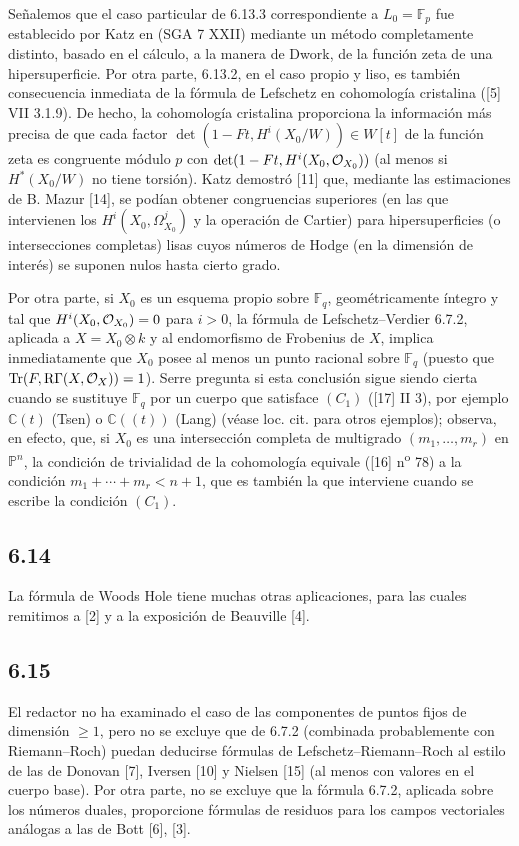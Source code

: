 Señalemos que el caso particular de 6.13.3 correspondiente a $L_0=\mathbb F_p$ fue establecido por Katz en (SGA 7 XXII) mediante un método completamente distinto, basado en el cálculo, a la manera de Dwork, de la función zeta de una hipersuperficie. Por otra parte, 6.13.2, en el caso propio y liso, es también consecuencia inmediata de la fórmula de Lefschetz en cohomología cristalina ([5] VII 3.1.9). De hecho, la cohomología cristalina proporciona la información más precisa de que cada factor $\det(1-Ft,H^i(X_0/W))\in W[t]$ de la función zeta es congruente módulo $p$ con $\det(1-Ft,H^i(X_0,\mathcal{O}_{X_0}))$ (al menos si $H^*(X_0/W)$ no tiene torsión). Katz demostró [11] que, mediante las estimaciones de B. Mazur [14], se podían obtener congruencias superiores (en las que intervienen los $H^i(X_0,\Omega^j_{X_0})$ y la operación de Cartier) para hipersuperficies (o intersecciones completas) lisas cuyos números de Hodge (en la dimensión de interés) se suponen nulos hasta cierto grado.

Por otra parte, si $X_0$ es un esquema propio sobre $\mathbb F_q$, geométricamente íntegro y tal que $H^i(X_0,\mathcal{O}_{X_0})=0$ para $i>0$, la fórmula de Lefschetz--Verdier 6.7.2, aplicada a $X=X_0\otimes k$ y al endomorfismo de Frobenius de $X$, implica inmediatamente que $X_0$ posee al menos un punto racional sobre $\mathbb F_q$ (puesto que $\operatorname{Tr}(F,\mathrm{R}\Gamma(X,\mathcal{O}_X))=1$). Serre pregunta si esta conclusión sigue siendo cierta cuando se sustituye $\mathbb F_q$ por un cuerpo que satisface $(C_1)$ ([17] II 3), por ejemplo $\mathbb C(t)$ (Tsen) o $\mathbb C((t))$ (Lang) (véase loc. cit. para otros ejemplos); observa, en efecto, que, si $X_0$ es una intersección completa de multigrado $(m_1,\ldots,m_r)$ en $\mathbb P^n$, la condición de trivialidad de la cohomología equivale ([16] n\textsuperscript{o} 78) a la condición $m_1+\cdots+m_r<n+1$, que es también la que interviene cuando se escribe la condición $(C_1)$.

\subsection*{6.14}
La fórmula de Woods Hole tiene muchas otras aplicaciones, para las cuales remitimos a [2] y a la exposición de Beauville [4].


\subsection*{6.15}

El redactor no ha examinado el caso de las componentes de puntos fijos de dimensión $\geq1$, pero no se excluye que de 6.7.2 (combinada probablemente con Riemann--Roch) puedan deducirse fórmulas de Lefschetz--Riemann--Roch al estilo de las de Donovan [7], Iversen [10] y Nielsen [15] (al menos con valores en el cuerpo base). Por otra parte, no se excluye que la fórmula 6.7.2, aplicada sobre los números duales, proporcione fórmulas de residuos para los campos vectoriales análogas a las de Bott [6], [3].

